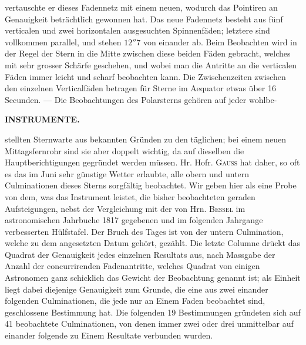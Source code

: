 vertauschte er dieses Fadennetz mit einem neuen, wodurch das Pointiren an Genauigkeit beträchtlich
gewonnen hat. Das neue Fadennetz besteht aus fünf verticalen und zwei horizontalen ausgesuchten
Spinnenfäden; letztere sind vollkommen parallel, und stehen $12''7$ von einander ab. Beim Beobachten
wird in der Regel der Stern in die Mitte zwischen diese beiden Fäden gebracht, welches mit sehr
grosser Schärfe geschehen, und wobei man die Antritte an die verticalen Fäden immer leicht und scharf
beobachten kann. Die Zwischenzeiten zwischen den einzelnen Verticalfäden betragen für Sterne im
Aequator etwas über 16 Secunden. --- Die Beobachtungen des Polarsterns gehören auf jeder wohlbe-\par
\clearpage
\noindent{}%
%
\parbox[t]{\dimexpr\linewidth-24mm\relax}{\centering\footnotesize\bfseries INSTRUMENTE.\par}%
\makebox[12mm][r]{}\par\nobreak\medskip
\noindent stellten Sternwarte aus bekannten Gründen zu den täglichen; bei einem neuen Mittagsfernrohr sind sie
aber doppelt wichtig, da auf dieselben die Hauptberichtigungen gegründet werden müssen. Hr. Hofr.
\textsc{Gauss} hat daher, so oft es das im Juni sehr günstige Wetter erlaubte, alle obern und untern Culminationen
dieses Sterns sorgfältig beobachtet. Wir geben hier als eine Probe von dem, was das Instrument
leistet, die bisher beobachteten geraden Aufsteigungen, nebst der Vergleichung mit der von Hrn.
\textsc{Bessel} im astronomischen Jahrbuche 1817 gegebenen und im folgenden Jahrgange verbesserten Hülfstafel.
Der Bruch des Tages ist von der untern Culmination, welche zu dem angesetzten Datum gehört,
gezählt. Die letzte Columne drückt das Quadrat der Genauigkeit jedes einzelnen Resultats aus, nach
Massgabe der Anzahl der concurrirenden Fadenantritte, welches Quadrat von einigen Astronomen ganz
schicklich das Gewicht der Beobachtung genannt ist; als Einheit liegt dabei diejenige Genauigkeit zum
Grunde, die eine aus zwei einander folgenden Culminationen, die jede nur an Einem Faden beobachtet
sind, geschlossene Bestimmung hat. Die folgenden 19 Bestimmungen gründeten sich auf 41 beobachtete
Culminationen, von denen immer zwei oder drei unmittelbar auf einander folgende zu Einem Resultate
verbunden wurden.

